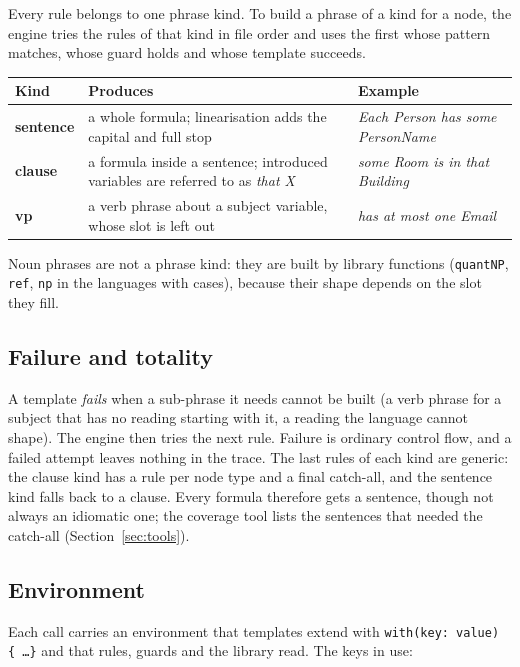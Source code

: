 \documentclass[11pt, a4paper]{article}
\newcommand{\code}[1]{\texttt{\color{codefg}#1}}
\begin{document}
Every rule belongs to one phrase kind. To build a phrase of a kind for a
node, the engine tries the rules of that kind in file order and uses the
first whose pattern matches, whose guard holds and whose template succeeds.

\begin{center}
\begin{tabularx}{\textwidth}{>{\bfseries}l X l}
\toprule
Kind & Produces & Example \\
\midrule
sentence & a whole formula; linearisation adds the capital and full stop &
  \textit{Each Person has some PersonName} \\
clause & a formula inside a sentence; introduced variables are referred
  to as \textit{that X} & \textit{some Room is in that Building} \\
vp & a verb phrase about a subject variable, whose slot is left out &
  \textit{has at most one Email} \\
\bottomrule
\end{tabularx}
\end{center}

Noun phrases are not a phrase kind: they are built by library functions
(\code{quantNP}, \code{ref}, \code{np} in the languages with cases), because
their shape depends on the slot they fill.

\subsection{Failure and totality}

A template \emph{fails} when a sub-phrase it needs cannot be built (a verb
phrase for a subject that has no reading starting with it, a reading the
language cannot shape). The engine then tries the next rule. Failure is
ordinary control flow, and a failed attempt leaves nothing in the trace. The
last rules of each kind are generic: the clause kind has a rule per node type
and a final catch-all, and the sentence kind falls back to a clause. Every
formula therefore gets a sentence, though not always an idiomatic one; the
coverage tool lists the sentences that needed the catch-all
(Section~\ref{sec:tools}).

\subsection{Environment}
\label{sec:env}

Each call carries an environment that templates extend with
\code{with(key: value) \{ \ldots \}} and that rules, guards and the library
read. The keys in use:
\end{document}
